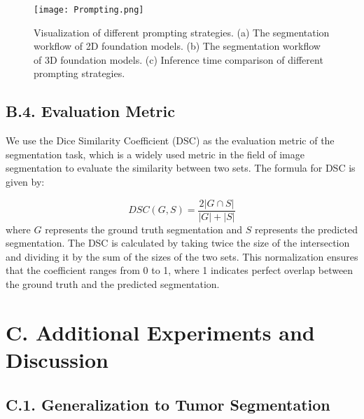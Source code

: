 \begin{figure*}[t]
    \centering
	\texttt{[image: Prompting.png]}
	\caption{Visualization of different prompting strategies. (a) The segmentation workflow of 2D foundation models. (b) The segmentation workflow of 3D foundation models. (c) Inference time comparison of different prompting strategies.}
    \label{prompting}
\end{figure*}



\subsection*{B.4. Evaluation Metric}

We use the Dice Similarity Coefficient (DSC) as the evaluation metric of the segmentation task, which is a widely used metric in the field of image segmentation to evaluate the similarity between two sets. The formula for DSC is given by:

\begin{equation*}
DSC(G, S) = \frac{2|G\cap S|}{|G| + |S|}
\label{DSC}
\end{equation*}
where $G$ represents the ground truth segmentation and $S$ represents the predicted segmentation. The DSC is calculated by taking twice the size of the intersection and dividing it by the sum of the sizes of the two sets. This normalization ensures that the coefficient ranges from 0 to 1, where 1 indicates perfect overlap between the ground truth and the predicted segmentation.


\section*{C. Additional Experiments and Discussion}

\subsection*{C.1. Generalization to Tumor Segmentation}


